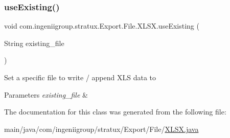 \mbox{\label{classcom_1_1ingeniigroup_1_1stratux_1_1_export_1_1_file_1_1_x_l_s_x_afa9311902d886f5b24d2b626ddc55a72}} 
\subsubsection{\texorpdfstring{use\+Existing()}{useExisting()}}
{\footnotesize\ttfamily void com.\+ingeniigroup.\+stratux.\+Export.\+File.\+X\+L\+S\+X.\+use\+Existing (\begin{DoxyParamCaption}\item[{String}]{existing\+\_\+file }\end{DoxyParamCaption})}

Set a specific file to write / append X\+LS data to


\begin{DoxyParams}{Parameters}
{\em existing\+\_\+file} & \\
\hline
\end{DoxyParams}


The documentation for this class was generated from the following file\+:\begin{DoxyCompactItemize}
\item 
main/java/com/ingeniigroup/stratux/\+Export/\+File/\hyperlink{_x_l_s_x_8java}{X\+L\+S\+X.\+java}\end{DoxyCompactItemize}
